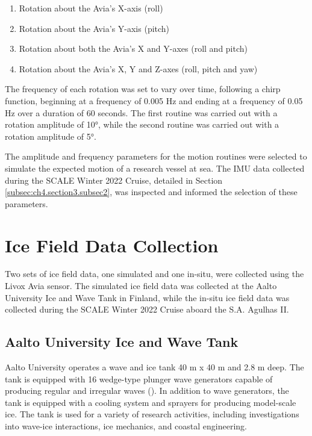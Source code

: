 \begin{enumerate}
    \item Rotation about the Avia's X-axis (roll)
    \item Rotation about the Avia's Y-axis (pitch)
    \item Rotation about both the Avia's X and Y-axes (roll and pitch)
    \item Rotation about the Avia's X, Y and Z-axes (roll, pitch and yaw)
\end{enumerate}

The frequency of each rotation was set to vary over time, following a chirp function, beginning at a frequency of 0.005 Hz and ending at a frequency of 0.05 Hz over a duration of 60 seconds. The first routine was carried out with a rotation amplitude of 10°, while the second routine was carried out with a rotation amplitude of 5°.

The amplitude and frequency parameters for the motion routines were selected to simulate the expected motion of a research vessel at sea. The \ac{IMU} data collected during the \ac{SCALE} Winter 2022 Cruise, detailed in Section \ref{subsec:ch4.section3.subsec2}, was inspected and informed the selection of these parameters.

\newpage
\section{Ice Field Data Collection}
\label{sec:ch4.section3}

Two sets of ice field data, one simulated and one in-situ, were collected using the Livox Avia sensor. The simulated ice field data was collected at the Aalto University Ice and Wave Tank in Finland, while the in-situ ice field data was collected during the \ac{SCALE} Winter 2022 Cruise aboard the S.A. Agulhas II. 

\subsection{Aalto University Ice and Wave Tank}
\label{subsec:ch4.section3.subsec1}

Aalto University operates a wave and ice tank 40 m x 40 m and 2.8 m deep. The tank is equipped with 16 wedge-type plunger wave generators capable of producing regular and irregular waves (\cite{AaltoIceWave2024}). In addition to wave generators, the tank is equipped with a cooling system and sprayers for producing model-scale ice. The tank is used for a variety of research activities, including investigations into wave-ice interactions, ice mechanics, and coastal engineering.

